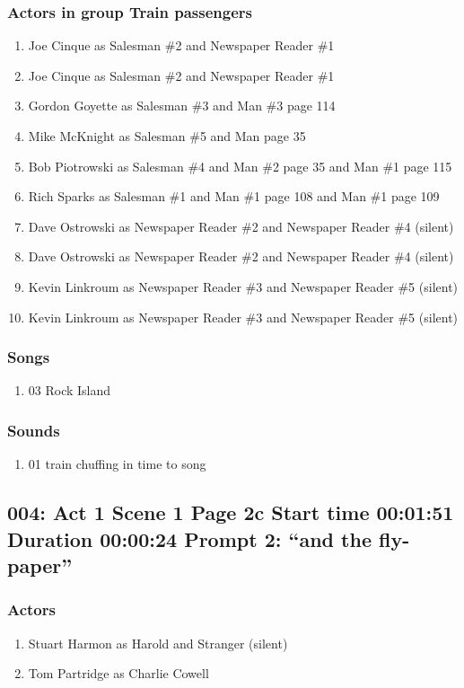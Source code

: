 \subsubsection{Actors in group Train passengers}
\begin{enumerate}
\item Joe Cinque as Salesman \#2 and Newspaper Reader \#1
\item Joe Cinque as Salesman \#2 and Newspaper Reader \#1
\item Gordon Goyette as Salesman \#3 and Man \#3 page 114
\item Mike McKnight as Salesman \#5 and Man page 35
\item Bob Piotrowski as Salesman \#4 and Man \#2 page 35 and Man \#1 page 115
\item Rich Sparks as Salesman \#1 and Man \#1 page 108 and Man \#1 page 109
\item Dave Ostrowski as Newspaper Reader \#2 and Newspaper Reader \#4 (silent)
\item Dave Ostrowski as Newspaper Reader \#2 and Newspaper Reader \#4 (silent)
\item Kevin Linkroum as Newspaper Reader \#3 and Newspaper Reader \#5 (silent)
\item Kevin Linkroum as Newspaper Reader \#3 and Newspaper Reader \#5 (silent)
\end{enumerate}

\subsubsection{Songs}
\begin{enumerate}
\item 03 Rock Island
\end{enumerate}\subsubsection{Sounds}
\begin{enumerate}
\item 01 train chuffing in time to song
\end{enumerate}
\subsection{004: Act 1 Scene 1 Page 2c Start time 00:01:51 Duration 00:00:24 Prompt 2: ``and the fly-paper''}

\subsubsection{Actors}
\begin{enumerate}
\item Stuart Harmon as Harold and Stranger (silent)
\item Tom Partridge as Charlie Cowell
\end{enumerate}
